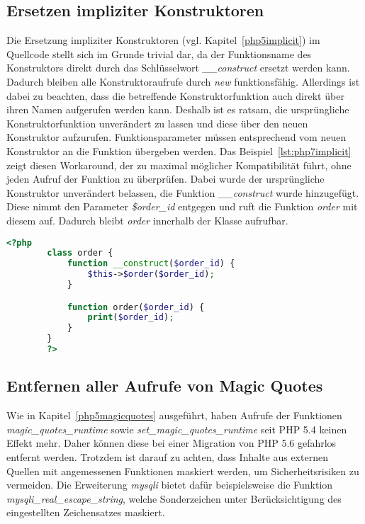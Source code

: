     \subsection{Ersetzen impliziter Konstruktoren}\label{construct}
    Die Ersetzung impliziter Konstruktoren (vgl. Kapitel~\ref{php5implicit}) im Quellcode stellt sich im Grunde trivial dar, da der 
    Funktionsname des Konstruktors direkt durch das Schlüsselwort \textit{\_\_construct} ersetzt werden kann. 
    Dadurch bleiben alle Konstruktoraufrufe durch \textit{new} funktionsfähig. Allerdings 
    ist dabei zu beachten, dass die betreffende Konstruktorfunktion auch direkt über ihren Namen aufgerufen werden kann.
    Deshalb ist es ratsam, die ursprüngliche Konstruktorfunktion unverändert zu lassen und diese über den neuen 
    Konstruktor aufzurufen. Funktionsparameter müssen entsprechend vom neuen Konstruktor an die Funktion übergeben werden. 
    Das Beispiel~\ref{lst:php7implicit} zeigt diesen Workaround, der zu maximal möglicher Kompatibilität führt, 
    ohne jeden Aufruf der Funktion zu überprüfen. Dabei 
    wurde der ursprüngliche Konstruktor unverändert belassen, die Funktion \textit{\_\_construct} wurde hinzugefügt. Diese 
    nimmt den Parameter \textit{\$order\_id} entgegen und ruft die Funktion \textit{order} mit diesem auf. Dadurch 
    bleibt \textit{order} innerhalb der Klasse aufrufbar.
    \begin{lstlisting}[language=php, caption={Beispiel der Ersetzung impliziter Konstruktoren}, label={lst:php7implicit}]
        <?php
        class order {
            function __construct($order_id) {
                $this->$order($order_id);
            }

            function order($order_id) {
                print($order_id);
            }
        }
        ?>
    \end{lstlisting}

    
    \subsection{Entfernen aller Aufrufe von Magic Quotes}
    Wie in Kapitel~\ref{php5magicquotes} ausgeführt, haben Aufrufe der Funktionen \textit{magic\_quotes\_runtime} sowie \textit{set\_magic\_quotes\_runtime} seit \ac{PHP} 5.4 
    keinen Effekt mehr. Daher können diese bei einer Migration von \ac{PHP} 5.6 gefahrlos entfernt werden. Trotzdem ist darauf zu achten, dass Inhalte aus 
    externen Quellen mit angemessenen Funktionen maskiert werden, um Sicherheitsrisiken zu vermeiden. Die Erweiterung \textit{mysqli} bietet dafür beispielsweise 
    die Funktion \textit{mysqli\_real\_escape\_string}, welche Sonderzeichen unter Berücksichtigung des eingestellten Zeichensatzes maskiert.
    
